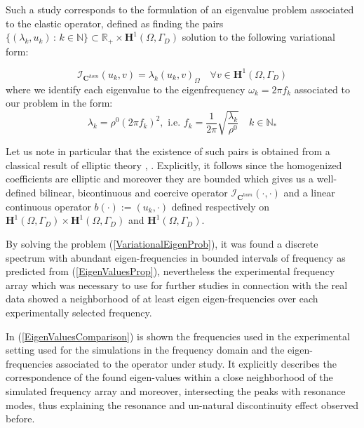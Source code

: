 Such a study corresponds to the formulation of an eigenvalue problem associated to the elastic operator, defined as finding the pairs $\{(\lambda_k, u_k) \, : \, k \in \mathbb{N} \} \subset \mathbb{R}_+ \times \mathbf{H}^1(\Omega, \Gamma_D)$ solution to the following variational form:

\begin{equation*}
    \label{VariationalEigenProb}
    \mathcal{I}_{\mathbf{C}^{hom}} (u_k, v) = \lambda_k (u_k, v)_{\Omega} \quad \forall v \in \mathbf{H}^1(\Omega, \Gamma_D)
\end{equation*}
where we identify each eigenvalue to the eigenfrequency $\omega_k = 2 \pi f_k$ associated to our problem in the form:
\begin{equation*}
    \lambda_k = \rho^0 (2\pi f_k)^2, \text{ i.e. } f_k = \frac{1}{2\pi} \sqrt{\frac{\lambda_k}{\rho^0}} \quad k \in \mathbb{N}_{*}
\end{equation*}

\begin{rem}
Let us note in particular that the existence of such pairs is obtained from a classical result of elliptic theory \cite{raviart1983introduction}, \cite{evans2010partial}. Explicitly, it follows since the homogenized coefficients are elliptic and moreover they are bounded which gives us a well-defined bilinear, bicontinuous and coercive operator $\mathcal{I}_{\mathbf{C}^{hom}}(\cdot, \cdot)$ and a linear continuous operator $b(\cdot) := (u_k, \cdot)$ defined respectively on $\mathbf{H}^1(\Omega, \Gamma_D)\times \mathbf{H}^1(\Omega, \Gamma_D)$ and $\mathbf{H}^1(\Omega, \Gamma_D)$.
\end{rem}


By solving the problem (\ref{VariationalEigenProb}), it was found a discrete spectrum with abundant eigen-frequencies in bounded intervals of frequency as predicted from (\ref{EigenValuesProp}), nevertheless the experimental frequency array which was necessary to use for further studies in connection with the real data showed a neighborhood of at least eigen eigen-frequencies over each experimentally selected frequency. 

In (\ref{EigenValuesComparison}) is shown the frequencies used in the experimental setting used for the simulations in the frequency domain and the eigen-frequencies associated to the operator under study. It explicitly describes the correspondence of the found eigen-values within a close neighborhood of the simulated frequency array and moreover, intersecting the peaks with resonance modes, thus explaining the resonance and un-natural discontinuity effect observed before.

